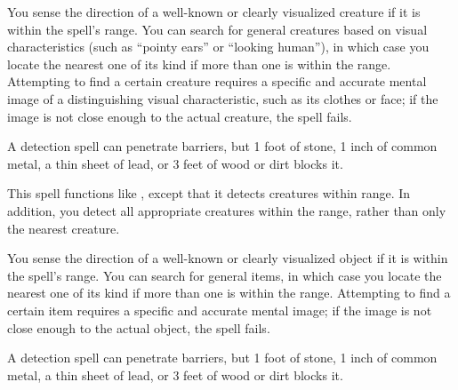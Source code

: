 \spellrng{\rngmed}
\begin{spelleffect}
  You sense the direction of a well-known or clearly visualized creature if it is within the spell's range. You can search for general creatures based on visual characteristics (such as ``pointy ears'' or ``looking human''), in which case you locate the nearest one of its kind if more than one is within the range. Attempting to find a certain creature requires a specific and accurate mental image of a distinguishing visual characteristic, such as its clothes or face; if the image is not close enough to the actual creature, the spell fails.
\end{spelleffect}
\begin{spellnotes}
  A detection spell can penetrate barriers, but 1 foot of stone, 1 inch of common metal, a thin sheet of lead, or 3 feet of wood or dirt blocks it.
\end{spellnotes}

\spellrng{\rngext}
\begin{spelleffect}
    This spell functions like , except that it detects creatures within \rngext range. In addition, you detect all appropriate creatures within the range, rather than only the nearest creature.
\end{spelleffect}

\spellrng{\rngmed}
\begin{spelleffect}
  You sense the direction of a well-known or clearly visualized object if it is within the spell's range. You can search for general items, in which case you locate the nearest one of its kind if more than one is within the range. Attempting to find a certain item requires a specific and accurate mental image; if the image is not close enough to the actual object, the spell fails.
\end{spelleffect}
\begin{spellnotes}
  A detection spell can penetrate barriers, but 1 foot of stone, 1 inch of common metal, a thin sheet of lead, or 3 feet of wood or dirt blocks it.
\end{spellnotes}

